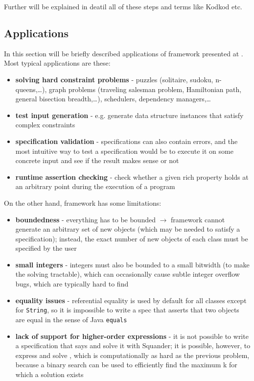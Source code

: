\documentclass[11pt,twoside,a4paper]{book}
\begin{document}
Further will be explained in deatil all of these steps and terms like Kodkod
etc.

\subsection{Applications}
\label{sub:apps}
In this section will be briefly described applications of framework presented
at \cite{web:squander}. Most typical applications are these:
\begin{itemize}
  \item \textbf{solving hard constraint problems} - puzzles (solitaire, sudoku,
  n-queens,\ldots), graph problems (traveling salesman problem, Hamiltonian
  path, general bisection breadth,\ldots), schedulers, dependency managers,\ldots
  \item \textbf{test input generation} - e.g. generate data structure instances
  that satisfy complex constraints
  \item \textbf{specification validation} - specifications can also contain
  errors, and the most intuitive way to test a specification would be to execute
  it on some concrete input and see if the result makes sense or not
  \item \textbf{runtime assertion checking} - check whether a given rich
  property holds at an arbitrary point during the execution of a program
\end{itemize}

On the other hand, framework has some limitations:
\begin{itemize}
  \item \textbf{boundedness} - everything has to be bounded $\rightarrow$ framework
  cannot generate an arbitrary set of new objects (which may be needed to satisfy a
  specification); instead, the exact number of new objects of each class must be
  specified by the user
  \item \textbf{small integers} - integers must also be bounded to a small
  bitwidth (to make the solving tractable), which can occasionally cause subtle
  integer overflow bugs, which are typically hard to find
  \item \textbf{equality issues} - referential equality is used by default for
  all classes except for \verb|String|, so it is impossible to write a spec that
  asserts that two objects are equal in the sense of Java \verb|equals|
  \item \textbf{lack of support for higher-order expressions} - it is not
  possible to write a specification that says  and solve it with
  Squander; it is possible, however, to express and solve , which is computationally as hard as the previous
  problem, because a binary search can be used to efficiently find the maximum k
  for which a solution exists
 
 
\end{itemize}
\end{document}
